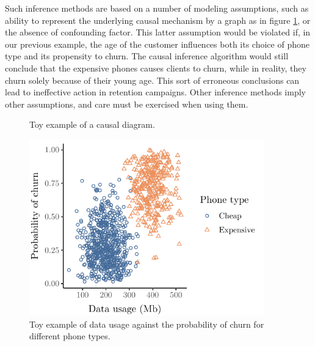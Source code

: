 Such inference methods are based on a number of modeling assumptions, such as
ability to represent the underlying causal mechanism by a graph as in figure
\ref{fig:simple_causal}, or the absence of confounding factor. This latter
assumption would be violated if, in our previous example, the age of the
customer influences both its choice of phone type and its propensity  to churn.
The causal inference algorithm would still conclude that the expensive phones
causes clients to churn, while in reality, they churn solely because of their
young age. This sort of erroneous conclusions can lead to ineffective action in
retention campaigns. Other inference methods imply other assumptions, and care
must be exercised when using them.

\begin{figure}
    \centering
    \caption{Toy example of a causal diagram.}
    \label{fig:simple_causal}
\end{figure}

\begin{figure}
    \centering
    \includegraphics[width=4in]{figures/simple_causal_plot.pdf}
    \caption{Toy example of data usage against the probability of churn for
    different phone types.}
    \label{fig:simple_causal_plot}
\end{figure}

